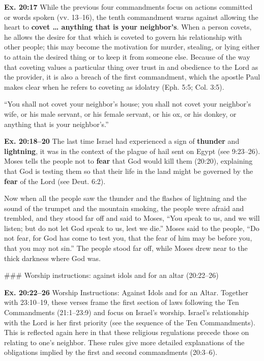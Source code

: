 \documentclass{bible-study-handout}
\begin{document}
\begin{studycomment}\textbf{Ex. 20:17} While the previous four commandments focus on actions committed or words spoken (vv. 13–16), the tenth commandment warns against allowing the heart to \textbf{covet … anything that is your neighbor’s}. When a person covets, he allows the desire for that which is coveted to govern his relationship with other people; this may become the motivation for murder, stealing, or lying either to attain the desired thing or to keep it from someone else. Because of the way that coveting values a particular thing over trust in and obedience to the Lord as the provider, it is also a breach of the first commandment, which the apostle Paul makes clear when he refers to coveting as idolatry (Eph. 5:5; Col. 3:5).\end{studycomment}“You shall not covet your neighbor’s house; you shall not covet your neighbor’s wife, or his male servant, or his female servant, or his ox, or his donkey, or anything that is your neighbor’s.”

\begin{studycommentinline}\textbf{Ex. 20:18–20} The last time Israel had experienced a sign of \textbf{thunder} and \textbf{lightning}, it was in the context of the plague of hail sent on Egypt (see 9:23–26). Moses tells the people not to \textbf{fear} that God would kill them (20:20), explaining that God is testing them so that their life in the land might be governed by the \textbf{fear} of the Lord (see Deut. 6:2).\end{studycommentinline}

Now when all the people saw the thunder and the flashes of lightning and the sound of the trumpet and the mountain smoking, the people were afraid and trembled, and they stood far off and said to Moses, “You speak to us, and we will listen; but do not let God speak to us, lest we die.” Moses said to the people, “Do not fear, for God has come to test you, that the fear of him may be before you, that you may not sin.” The people stood far off, while Moses drew near to the thick darkness where God was.

\begin{bookoutline}
### Worship instructions: against idols and for an altar (20:22–26)
\end{bookoutline}

\begin{studycomment*}\textbf{Ex. 20:22–26} Worship Instructions: Against Idols and for an Altar. Together with 23:10–19, these verses frame the first section of laws following the Ten Commandments (21:1–23:9) and focus on Israel’s worship. Israel’s relationship with the Lord is her first priority (see the sequence of the Ten Commandments). This is reflected again here in that these religious regulations precede those on relating to one’s neighbor. These rules give more detailed explanations of the obligations implied by the first and second commandments (20:3–6).\end{studycomment*}
\end{document}
